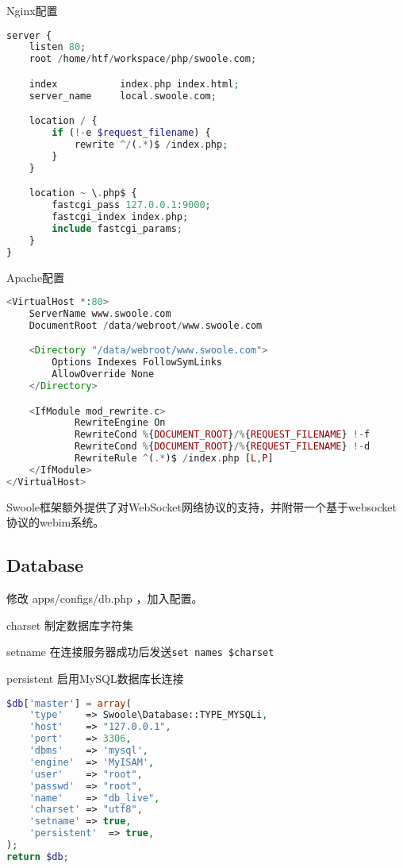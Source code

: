 \begin{compactitem}
\item Nginx配置

\begin{lstlisting}[language=PHP]
server {
    listen 80;
    root /home/htf/workspace/php/swoole.com;

    index           index.php index.html;
    server_name     local.swoole.com;

    location / {
        if (!-e $request_filename) {
            rewrite ^/(.*)$ /index.php;
        }
    }

    location ~ \.php$ {
        fastcgi_pass 127.0.0.1:9000;
        fastcgi_index index.php;
        include fastcgi_params;
    }
}
\end{lstlisting}

\item Apache配置

\begin{lstlisting}[language=PHP]
<VirtualHost *:80>
    ServerName www.swoole.com
    DocumentRoot /data/webroot/www.swoole.com

    <Directory "/data/webroot/www.swoole.com">
        Options Indexes FollowSymLinks
        AllowOverride None
    </Directory>

    <IfModule mod_rewrite.c>
            RewriteEngine On
            RewriteCond %{DOCUMENT_ROOT}/%{REQUEST_FILENAME} !-f
            RewriteCond %{DOCUMENT_ROOT}/%{REQUEST_FILENAME} !-d
            RewriteRule ^(.*)$ /index.php [L,P]
    </IfModule>
</VirtualHost>
\end{lstlisting}
\end{compactitem}

Swoole框架额外提供了对WebSocket网络协议的支持，并附带一个基于websocket协议的webim系统。


\subsection{Database}

修改 apps/configs/db.php ，加入配置。


\begin{compactitem}
\item charset 制定数据库字符集
\item setname 在连接服务器成功后发送\texttt{set names \$charset}
\item persistent 启用MySQL数据库长连接
\end{compactitem}


\begin{lstlisting}[language=PHP]
$db['master'] = array(
    'type'    => Swoole\Database::TYPE_MYSQLi,
    'host'    => "127.0.0.1",
    'port'    => 3306,
    'dbms'    => 'mysql',
    'engine'  => 'MyISAM',
    'user'    => "root",
    'passwd'  => "root",
    'name'    => "db_live",
    'charset' => "utf8",
    'setname' => true,
    'persistent'  => true,
);
return $db;
\end{lstlisting}


